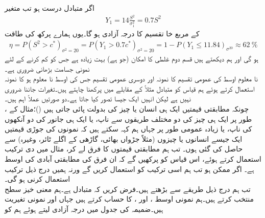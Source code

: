 اگر متبادل درست ہو تب متغیر
\begin{align*}
Y_1=14\frac{S^2}{\sigma_1^2}=0.7S^2
\end{align*}
کے مربع خا تقسیم کا درجہ آزادی  ہو گا۔یوں ہمارے پرکھ کی طاقت
\begin{align*}
\eta=P(S^2>c^*)_{\sigma^2=20}=P(Y_1>0.7c^*)_{\sigma^2=20}=1-P(Y_1\le 11.84)_{\sigma^20}\approx \SI{62}{\percent}
\end{align*}
ہو گی اور ہم دیکھتے ہیں قسم دوم غلطی کا امکان (جو  ہے) بہت زیادہ ہے جس کو کم کرنے کے لئے نمونی جسامت بڑھانی ضروری ہے۔
\quad {}\\
نا معلوم اوسط  کی عمومی تقسیم کا نمونہ  اور دوسری عمومی تقسیم جس کی اوسط  نا معلوم ہو کا نمونہ  استعمال کرتے ہوئے ہم قیاس  کو متبادل مثلاً   کے مقابلے میں پرکھنا چاہتے ہیں۔تغیرات جاننا ضروری نہیں ہے لیکن انہیں ایک جیسا تصور کیا جاتا ہے۔دو صورتیں عملاً اہم ہیں۔\\
\quad
{}، چونکہ مطابقتی قیمتیں ایک ہی انسان یا چیز کی بدولت پائی جاتی ہیں ()؛مثال کے طور پر ایک ہی چیز کی دو مختلف طریقوں سے ناپ، یا ایک ہی جانور کی دو آنکھوں کی ناپ، یا زیادہ عمومی طور پر جہاں ہم کہہ سکتے ہیں کہ  نمونوں کی جوڑی قیمتیں  ایک جیسے انسانوں یا چیزوں (مثلاً جڑواں بھائی،  گاڑھی کے اگلے ٹائر، وغیرہ) سے حاصل کی گئی ہوں۔ تب ہم مطابقتی قیمتوں کا فرق لے کر، مثال  میں دی ترکیب استعمال کرتے ہوئے، اس قیاس کو پرکھیں گے کہ ان فرق کی مطابقتی آبادی  کی اوسط   ہے۔  اگر ممکن ہو تب ہم اسی ترکیب کو استعمال کریں گے ورنہ ہمیں درج ذیل ترکیب استعمال کرنی ہو گی۔\\
\quad
{} تب ہم درج ذیل طریقے سے بڑھتے ہیں۔فرض کریں کہ متبادل  ہے۔ہم معنی خیز سطح  منتخب کرتے ہیں۔ہم نمونی اوسط ،  اور ،  کا حساب کرتے ہیں جہاں  اور  نمونی تغیریت ہیں۔ضمیمہ  کی جدول  میں  درجہ آزادی لیتے ہوئے ہم  کو
